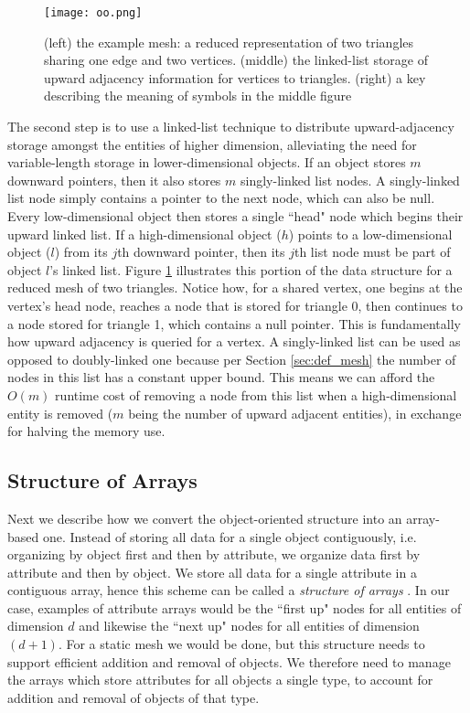 \begin{figure}
\begin{center}
\texttt{[image: oo.png]}
\caption{(left) the example mesh: a reduced representation of two
triangles sharing one edge and two vertices.
(middle) the linked-list storage of upward adjacency information
for vertices to triangles.
(right) a key describing the meaning of symbols in the middle figure}
\label{fig:oo}
\end{center}
\end{figure}

The second step is to use a linked-list technique \cite{karamete2016novel}
to distribute upward-adjacency storage amongst the entities
of higher dimension, alleviating the need for variable-length
storage in lower-dimensional objects.
If an object stores $m$ downward pointers, then it also stores
$m$ singly-linked list nodes.
A singly-linked list node simply contains a pointer to the next
node, which can also be null.
Every low-dimensional object then stores a single ``head" node
which begins their upward linked list.
If a high-dimensional object ($h$) points to a low-dimensional object ($l$)
from its $j$th downward pointer, then its $j$th list node must be
part of object $l$'s linked list.
Figure \ref{fig:oo} illustrates this portion of the data structure
for a reduced mesh of two triangles.
Notice how, for a shared vertex, one begins at the vertex's head node,
reaches a node that is stored for triangle 0, then continues
to a node stored for triangle 1, which contains a null pointer.
This is fundamentally how upward adjacency is queried for a vertex.
A singly-linked list can be used as opposed to doubly-linked one
because per Section \ref{sec:def_mesh}
the number of nodes in this list has a constant upper bound.
This means we can afford the $O(m)$ runtime cost of removing a node from this
list when a high-dimensional entity is removed
($m$ being the number of upward adjacent entities),
in exchange for halving the memory use.

\subsection{Structure of Arrays}
\label{sec:sisc_soa}

Next we describe how we convert the object-oriented structure
into an array-based one.
Instead of storing all data for a single object contiguously,
i.e. organizing by object first and then by attribute,
we organize data first by attribute and then by object.
We store all data for a single attribute in a contiguous
array, hence this scheme can be called a {\it structure of arrays}
\cite{sung2012dl}.
In our case, examples of attribute arrays would be
the ``first up" nodes for all entities of dimension $d$
and likewise the ``next up" nodes for all entities of dimension $(d+1)$.
For a static mesh we would be done, but this structure needs
to support efficient addition and removal of objects.
We therefore need to manage the arrays which store attributes
for all objects a single type, to account for addition and removal
of objects of that type.

